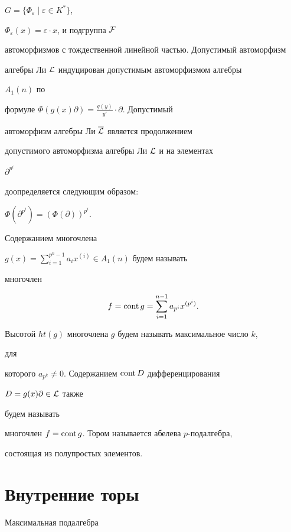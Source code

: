 $G=\{\Phi_\varepsilon\mid\varepsilon\in K^*\}$,


$\Phi_\varepsilon(x)=\varepsilon\cdot x$, и подгруппа $\cal F$


автоморфизмов с тождественной линейной частью. Допустимый автоморфизм


алгебры Ли $\cal L$ индуцирован допустимым автоморфизмом алгебры


$A_1(n)$ по


формуле $\Phi(g(x)\partial)=\frac{g(y)}{y'}\cdot\partial$. Допустимый


автоморфизм алгебры Ли $\overline{\cal L}$ является продолжением


допустимого автоморфизма алгебры Ли $\cal L$ и на элементах


$\partial^{p^i}$


доопределяется следующим образом:


$\Phi(\partial^{p^i})=(\Phi(\partial))^{p^i}$.





Содержанием многочлена


$g(x)=\sum\limits^{p^n-1}_{i=1}a_ix^{(i)}\in A_1(n)$ будем называть


многочлен


$$


f=\cont g=\sum^{n-1}_{i=1}a_{p^i}x^{(p^i)}.


$$





Высотой $ht(g)$ многочлена $g$ будем называть максимальное число $k$,


для


которого $a_{p^k}\ne 0$. Содержанием $\operatorname{cont} D$ дифференцирования


$D=g(x)\partial\in\cal L$ также


будем называть


многочлен $f=\operatorname{cont} g$. Тором называется абелева $p$-подалгебра,


состоящая из полупростых элементов.





\section{Внутренние торы}





Максимальная подалгебра


